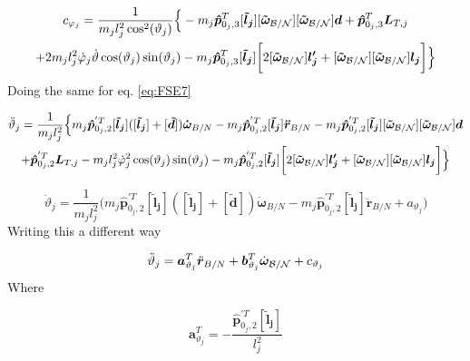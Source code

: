 \documentclass[]{BasiliskReportMemo}
\begin{document}
	\begin{multline}
	c_{\varphi_j} = \frac{1}{m_j l_j^2 \cos^2(\vartheta_j)}\Big\{-m_{j} \bm{\hat{p}}_{0_j,3}^{T} [\bm{\tilde{l}_j}][\bm{\tilde{\omega}}_{\cal B/N}][\bm{\tilde{\omega}}_{\cal B/N}] \bm{d}+\bm{\hat{p}}_{0_j,3}^T \bm{L}_{T,j}\\+2m_j l_j^2\dot{\varphi}_j\dot{\vartheta}\cos(\vartheta_j)\sin(\vartheta_j)- m_j \bm{\hat{p}}_{0_j,3}^T [\bm{\tilde{l}_j}]\bigg[2[\bm{\tilde{\omega}}_{\cal B/N}] \bm{l_j'}+[\bm{\tilde{\omega}}_{\cal B/N}][\bm{\tilde{\omega}}_{\cal B/N}] \bm{l_j}\bigg]\Big\}
	\label{eq:BSM6}
	\end{multline}	
	Doing the same for eq. \eqref{eq:FSE7}
	
	\begin{multline}
	\ddot{\vartheta}_j 
	=\frac{1}{m_j l_j^2}\Big\{m_{j}\bm{\hat{p}}_{0_j,2}^{'T} [\bm{\tilde{l}_j}]( [\bm{\tilde{l}_j}] + [\bm{\tilde{d}}])\bm{\dot{\omega}}_{B/N}
	-m_{j} \bm{\hat{p}}_{0_j,2}^{'T} [\bm{\tilde{l}_j}] \bm{\ddot{r}}_{B/N}-m_{j} \bm{\hat{p}}_{0_j,2}^{'T}[\bm{\tilde{l}_j}][\bm{\tilde{\omega}}_{\cal B/N}][\bm{\tilde{\omega}}_{\cal B/N}] \bm{d}\\+\bm{\hat{p}}_{0_j,2}^{'T} \bm{L}_{T,j}-m_j l_j^2\dot{\varphi}_j^2\cos(\vartheta_j)\sin(\vartheta_j)- m_j \bm{\hat{p}}_{0_j,2}^{'T} [\bm{\tilde{l}_j}]\bigg[2[\bm{\tilde{\omega}}_{\cal B/N}] \bm{l_j'}+[\bm{\tilde{\omega}}_{\cal B/N}][\bm{\tilde{\omega}}_{\cal B/N}] \bm{l_j}\bigg]\Big\}
	\label{eq:BSM7}
	\end{multline}
	
	\begin{equation}
	\ddot \vartheta_j =\frac{1}{m_j l_j^2} \Big(m_{j}\bm{\hat{p}}_{0_j,2}^{'T} [\bm{\tilde{l}_j}]([\bm{\tilde{l}_j}] + [\bm{\tilde{d}}])\bm{\dot{\omega}}_{B/N}
	-m_{j} \bm{\hat{p}}_{0_j,2}^{'T} [\bm{\tilde{l}_j}] \bm{\ddot{r}}_{B/N} + a_{\vartheta_j} \Big)
	\label{eq:BSM8}
	\end{equation}
	Writing this a different way
	
	\begin{equation}
	\ddot \vartheta_j = \bm a_{\vartheta_j}^T \ddot{\bm r}_{B/N} + \bm b_{\vartheta_j}^T \dot{\bm\omega}_{\cal B/N} + c_{\vartheta_j}
	\label{eq:BSM9}
	\end{equation}
	Where
	
	\begin{equation}
	\bm a_{\vartheta_j}^{T} = - \frac{ \bm{\hat{p}}_{0_j,2}^{'T} [\bm{\tilde{l}_j}]}{ l_j^2}
	\label{eq:BSM10}
	\end{equation}
	
\end{document}

